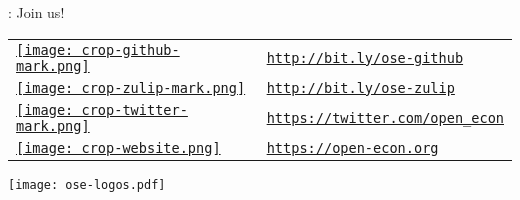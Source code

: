\begin{frame}{\insertsection: Join us!}
\begin{multicols}{2}
	
	\begin{table}[]
		\begin{tabularx}{1\textwidth}{>{\centering\arraybackslash}m{1.5cm} >{\centering\arraybackslash}m{3.7cm}}
			\href{http://bit.ly/ose-github}{\texttt{[image: crop-github-mark.png]}} &
			\href{http://bit.ly/ose-github}{\texttt{http://bit.ly/ose-github}} \\[1cm]
			
			\href{http://bit.ly/ose-zulip}{\texttt{[image: crop-zulip-mark.png]}} &
			\href{http://bit.ly/ose-zulip}{\texttt{http://bit.ly/ose-zulip}}    \\[0.8cm]
			
			\href{https://twitter.com/open_econ}{\texttt{[image: crop-twitter-mark.png]}} &
			\href{https://twitter.com/open_econ}{\texttt{https://twitter.com/open\_econ}} \\[0.8cm]
			
			\href{https://open-econ.org}{\texttt{[image: crop-website.png]}} & \href{https://open-econ.org}{\texttt{https://open-econ.org}}
		\end{tabularx}
	\end{table}
	
	\columnbreak
	
	\hspace{2.5cm}\texttt{[image: ose-logos.pdf]}
	
\end{multicols}
\end{frame}

